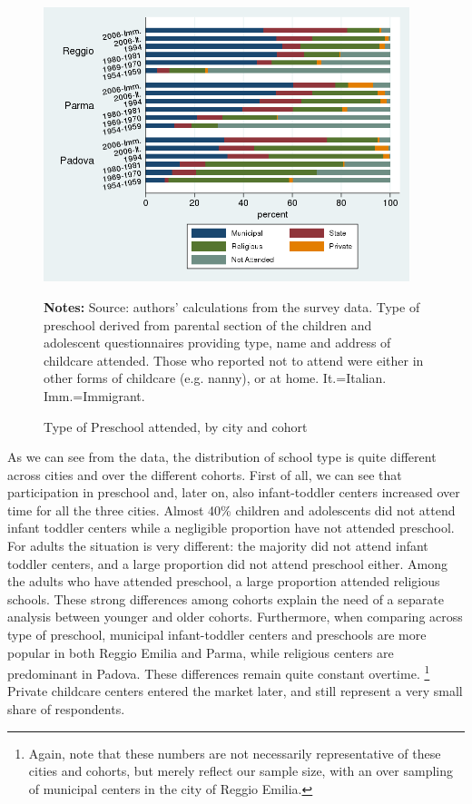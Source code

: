 \documentclass[12pt]{article}
\begin{document}
\begin{figure}[!htb]
\caption{Type of Preschool attended, by city and cohort}
\label{fig:preschoolAttend}
\begin{center}
\includegraphics[height=8cm]{maternaType-Attend.png}\\[0pt]
\end{center}
\par
{\footnotesize {{\bfseries Notes:} Source: authors' calculations from the survey data. Type of preschool derived from parental section of the children and adolescent questionnaires providing type, name and address of childcare attended. Those who reported not to attend were either in other forms of childcare (e.g. nanny), or at home. It.=Italian. Imm.=Immigrant.} }
\end{figure}

As we can see from the data, the distribution of school type is quite different across cities and over the different cohorts. First of all, we can see that participation in preschool and, later on, also infant-toddler centers increased over time for all the three cities. Almost 40\% children and adolescents did not attend infant toddler centers while a negligible proportion have not attended preschool. For adults the situation is very different: the majority did not attend infant toddler centers, and a large proportion did not attend preschool either. Among the adults who have attended preschool, a large proportion attended religious schools. These strong differences among cohorts explain the need of a separate analysis between younger and older cohorts. Furthermore, when comparing across type of preschool, municipal infant-toddler centers and preschools are more popular in both Reggio Emilia and Parma, while religious centers are predominant in Padova. These differences remain quite constant overtime. \footnote{Again, note that these numbers are not necessarily representative of these cities and cohorts, but merely reflect our sample size, with an over sampling of municipal centers in the city of Reggio Emilia.} Private childcare centers entered the market later, and still represent a very small share of respondents.
\end{document}
